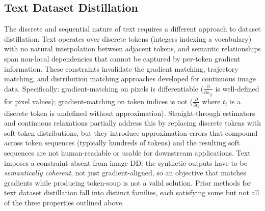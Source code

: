 \documentclass[12pt, a4paper, twoside]{book}
\numberwithin{equation}{chapter}
\theoremstyle{plain}
\theoremstyle{definition}
\theoremstyle{remark}
\newenvironment{foldable}{}{}
\begin{document}
\subsection{Text Dataset Distillation} \label{sec:26-background-datasetdistill-textdd}
\begin{foldable}
  The discrete and sequential nature of text requires a different approach to dataset distillation.
  Text operates over discrete tokens (integers indexing a vocabulary) with no natural interpolation between adjacent tokens, and semantic relationships span non-local dependencies that cannot be captured by per-token gradient information.
  These constraints invalidate the gradient matching, trajectory matching, and distribution matching approaches developed for continuous image data.
  Specifically: gradient-matching on pixels is differentiable ($\frac{\partial}{\partial x_{ij}}$ is well-defined for pixel values); gradient-matching on token indices is not ($\frac{\partial}{\partial t_i}$ where $t_i$ is a discrete token is undefined without approximation).
  Straight-through estimators and continuous relaxations partially address this by replacing discrete tokens with soft token distributions, but they introduce approximation errors that compound across token sequences (typically hundreds of tokens) and the resulting soft sequences are not human-readable or usable for downstream applications.
  Text imposes a constraint absent from image \ac{DD}: the synthetic outputs have to be \textit{semantically coherent}, not just gradient-aligned, so an objective that matches gradients while producing token-soup is not a valid solution.
  Prior methods for text dataset distillation fall into distinct families, each satisfying some but not all of the three properties outlined above.
\end{foldable}
\end{document}
